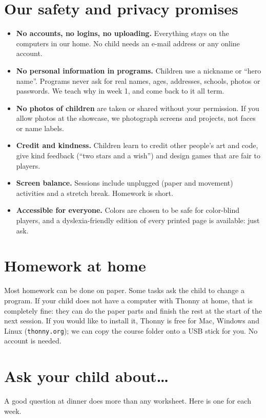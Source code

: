 \documentclass[level=2]{kidscode}
\begin{document}
\section{Our safety and privacy promises}
\begin{safety}
\begin{itemize}[itemsep=2pt]
  \item \textbf{No accounts, no logins, no uploading.} Everything stays on the computers in our home.
        No child needs an e-mail address or any online account.
  \item \textbf{No personal information in programs.} Children use a nickname or \enquote{hero name}.
        Programs never ask for real names, ages, addresses, schools, photos or passwords. We teach
        why in week 1, and come back to it all term.
  \item \textbf{No photos of children} are taken or shared without your permission. If you allow
        photos at the showcase, we photograph screens and projects, not faces or name labels.
  \item \textbf{Credit and kindness.} Children learn to credit other people's art and code, give
        kind feedback (\enquote{two stars and a wish}) and design games that are fair to players.
  \item \textbf{Screen balance.} Sessions include unplugged (paper and movement) activities and a
        stretch break. Homework is short.
  \item \textbf{Accessible for everyone.} Colors are chosen to be safe for color-blind players,
        and a dyslexia-friendly edition of every printed page is available: just ask.
\end{itemize}
\end{safety}

\section{Homework at home}
Most homework can be done on paper. Some tasks ask the child to change a program. If your child
does not have a computer with Thonny at home, that is completely fine: they can do the paper parts
and finish the rest at the start of the next session. If you would like to install it, Thonny is
free for Mac, Windows and Linux (\texttt{thonny.org}); we can copy the course folder onto a USB
stick for you. No account is needed.

\section{Ask your child about\ldots}
A good question at dinner does more than any worksheet. Here is one for each week.
\end{document}
